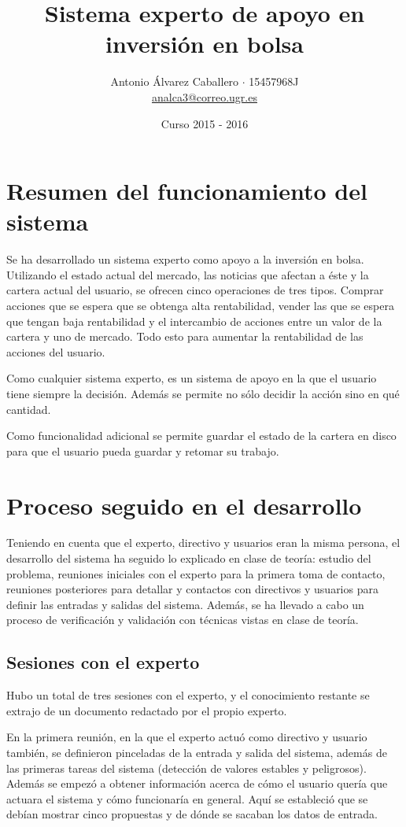 \documentclass[a4paper, 11pt, titlepage]{article}
\title{Sistema experto de apoyo en inversión en bolsa}
\author{Antonio Álvarez Caballero $\cdot$ 15457968J\\
    \href{mailto:analca3@correo.ugr.es}{analca3@correo.ugr.es}}
\date{Curso 2015 - 2016}
\theoremstyle{definition}
\begin{document}
  \maketitle
  \newpage

  \section{Resumen del funcionamiento del sistema}

  Se ha desarrollado un sistema experto como apoyo a la inversión en bolsa.
  Utilizando el estado actual del mercado, las noticias que afectan a éste y la
  cartera actual del usuario, se ofrecen cinco operaciones de tres tipos.
  Comprar acciones que se espera que se obtenga alta rentabilidad, vender las
  que se espera que tengan baja rentabilidad y el intercambio de acciones
  entre un valor de la cartera y uno de mercado. Todo esto para aumentar la
  rentabilidad de las acciones del usuario.

  Como cualquier sistema experto, es un sistema de apoyo en la que el usuario
  tiene siempre la decisión. Además se permite no sólo decidir la acción sino
  en qué cantidad.

  Como funcionalidad adicional se permite guardar el estado de la cartera en
  disco para que el usuario pueda guardar y retomar su trabajo.

  \section{Proceso seguido en el desarrollo}
  Teniendo en cuenta que el experto, directivo y usuarios eran la misma persona,
  el desarrollo del sistema ha seguido lo explicado en clase de teoría: estudio
  del problema, reuniones iniciales con el experto para la primera toma de
  contacto, reuniones posteriores para detallar y contactos con directivos
  y usuarios para definir las entradas y salidas del sistema. Además, se ha
  llevado a cabo un proceso de verificación y validación con técnicas vistas
  en clase de teoría.

  \subsection{Sesiones con el experto}
  Hubo un total de tres sesiones con el experto, y el conocimiento restante se
  extrajo de un documento redactado por el propio experto.

  En la primera reunión, en la que el experto actuó como directivo y usuario
  también, se definieron pinceladas de la entrada y salida del sistema, además
  de las primeras tareas del sistema (detección de valores estables y peligrosos).
  Además se empezó a obtener información acerca de cómo el usuario quería que
  actuara el sistema y cómo funcionaría en general. Aquí se estableció que
  se debían mostrar cinco propuestas y de dónde se sacaban los datos de entrada.
\end{document}
